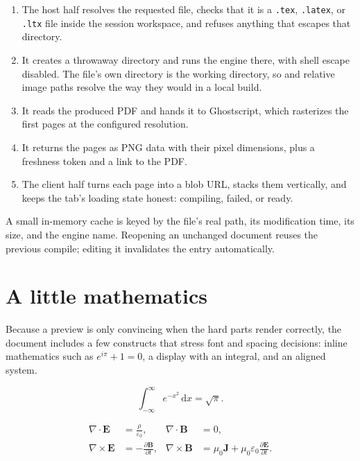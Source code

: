 \documentclass[11pt]{article}
\begin{document}
\begin{enumerate}
  \item The host half resolves the requested file, checks that it is a
        \texttt{.tex}, \texttt{.latex}, or \texttt{.ltx} file inside the
        session workspace, and refuses anything that escapes that directory.
  \item It creates a throwaway directory and runs the engine there, with shell
        escape disabled. The file's own directory is the working directory, so
        \verb|| and relative image paths resolve the way they would in a
        local build.
  \item It reads the produced PDF and hands it to Ghostscript, which rasterizes
        the first pages at the configured resolution.
  \item It returns the pages as PNG data with their pixel dimensions, plus a
        freshness token and a link to the PDF.
  \item The client half turns each page into a blob URL, stacks them vertically,
        and keeps the tab's loading state honest: compiling, failed, or ready.
\end{enumerate}

A small in-memory cache is keyed by the file's real path, its modification time,
its size, and the engine name. Reopening an unchanged document reuses the
previous compile; editing it invalidates the entry automatically.

\section{A little mathematics}

Because a preview is only convincing when the hard parts render correctly, the
document includes a few constructs that stress font and spacing decisions:
inline mathematics such as $e^{i\pi} + 1 = 0$, a display with an integral, and
an aligned system.

\begin{equation}
  \int_{-\infty}^{\infty} e^{-x^{2}}\,\mathrm{d}x = \sqrt{\pi}.
\end{equation}

\begin{align}
  \nabla \cdot \mathbf{E} &= \frac{\rho}{\varepsilon_{0}}, &
  \nabla \cdot \mathbf{B} &= 0, \\
  \nabla \times \mathbf{E} &= -\frac{\partial \mathbf{B}}{\partial t}, &
  \nabla \times \mathbf{B} &= \mu_{0}\mathbf{J}
    + \mu_{0}\varepsilon_{0}\frac{\partial \mathbf{E}}{\partial t}.
\end{align}
\end{document}
